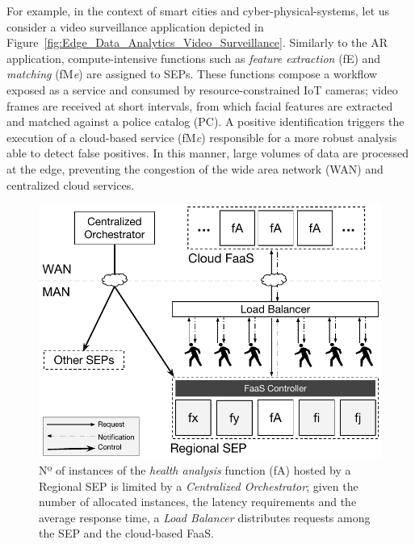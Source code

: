 
For example, in the context of smart cities and cyber-physical-systems, let us consider a video surveillance application 
depicted in Figure~\ref{fig:Edge_Data_Analytics_Video_Surveillance}. Similarly to the AR application, compute-intensive functions such as \textit{feature extraction} (fE) and \textit{matching} (fM\textit{e}) are assigned to SEPs.
These functions compose a workflow exposed as a service and consumed by resource-constrained IoT cameras; video frames are received at short intervals, from which facial features are extracted and matched against a police catalog (PC). A positive identification triggers the execution of a cloud-based service (fM\textit{c}) responsible for a more robust analysis able to detect false positives. In this manner, large volumes of data are processed at the edge, preventing the congestion of the wide area network (WAN) and centralized cloud services.

\begin{figure}[bp]
	\centering
	\includegraphics[width=\linewidth]{Figs/Edge_Data_Analytics_Personal_Assistant.pdf}
	\caption{Nº of instances of the \textit{health analysis} function (fA) hosted by a Regional SEP is limited by a \textit{Centralized Orchestrator}; given the number of allocated instances, the latency requirements and the average response time, a \textit{Load Balancer} distributes requests among the SEP and the cloud-based FaaS.}
	\label{fig:Edge_Data_Analytics_Personal_Assistant}
\end{figure}

